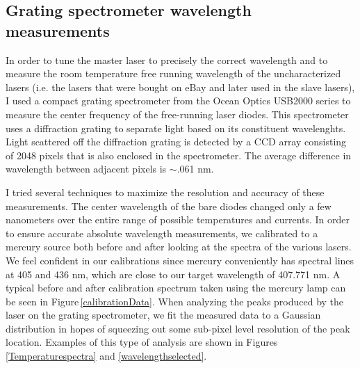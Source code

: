 \subsection{Grating spectrometer wavelength measurements}
\label{gratingSpectrometerWavelengthMeasurements}
In order to tune the master laser to precisely the correct wavelength and to measure the room temperature free running wavelength of the uncharacterized lasers (i.e. the lasers that were bought on eBay and later used in the slave lasers), I used a compact grating spectrometer from the Ocean Optics USB2000 series to measure the center frequency of the free-running laser diodes. This spectrometer uses a diffraction grating to separate light based on its constituent wavelenghts. Light scattered off the diffraction grating is detected by a CCD array consisting of 2048 pixels that is also enclosed in the spectrometer. The average difference in wavelength between adjacent pixels is $\sim$.061 nm. %

I tried several techniques to maximize the resolution and accuracy of these measurements. The center wavelength of the bare diodes changed only a few nanometers over the entire range of possible temperatures and currents. In order to ensure accurate absolute wavelength measurements, we calibrated to a mercury source both before and after looking at the spectra of the various lasers. We feel confident in our calibrations since mercury conveniently has spectral lines at 405 and 436 nm, which are close to our target wavelength of 407.771 nm. A typical before and after calibration spectrum taken using the mercury lamp can be seen in Figure\,\ref{calibrationData}. When analyzing the peaks produced by the laser on the grating spectrometer, we fit the measured data to a Gaussian distribution in hopes of squeezing out some sub-pixel level resolution of the peak location. Examples of this type of analysis are shown in Figures\,\ref{Temperaturespectra} and \ref{wavelengthselected}.

